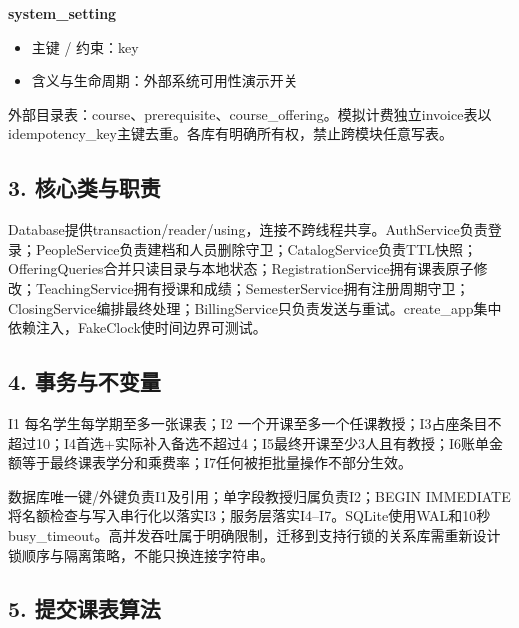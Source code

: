 \documentclass[UTF8,11pt,a4paper]{ctexart}
\providecommand{\tightlist}{\setlength{\itemsep}{0pt}\setlength{\parskip}{0pt}}
\begin{document}
\textbf{system\_\allowbreak{}setting}

\begin{itemize}
\tightlist
\item
  主键 / 约束：key
\item
  含义与生命周期：外部系统可用性演示开关
\end{itemize}

外部目录表：course、prerequisite、course\_\allowbreak{}offering。模拟计费独立invoice表以idempotency\_\allowbreak{}key主键去重。各库有明确所有权，禁止跨模块任意写表。

\hypertarget{3-ux6838ux5fc3ux7c7bux4e0eux804cux8d23}{%
\subsection{3.
核心类与职责}\label{3-ux6838ux5fc3ux7c7bux4e0eux804cux8d23}}

Database提供transaction/reader/using，连接不跨线程共享。AuthService负责登录；PeopleService负责建档和人员删除守卫；CatalogService负责TTL快照；OfferingQueries合并只读目录与本地状态；RegistrationService拥有课表原子修改；TeachingService拥有授课和成绩；SemesterService拥有注册周期守卫；ClosingService编排最终处理；BillingService只负责发送与重试。create\_\allowbreak{}app集中依赖注入，FakeClock使时间边界可测试。

\hypertarget{4-ux4e8bux52a1ux4e0eux4e0dux53d8ux91cf}{%
\subsection{4.
事务与不变量}\label{4-ux4e8bux52a1ux4e0eux4e0dux53d8ux91cf}}

I1 每名学生每学期至多一张课表；I2
一个开课至多一个任课教授；I3占座条目不超过10；I4首选+实际补入备选不超过4；I5最终开课至少3人且有教授；I6账单金额等于最终课表学分和乘费率；I7任何被拒批量操作不部分生效。

数据库唯一键/外键负责I1及引用；单字段教授归属负责I2；BEGIN
IMMEDIATE将名额检查与写入串行化以落实I3；服务层落实I4--I7。SQLite使用WAL和10秒busy\_\allowbreak{}timeout。高并发吞吐属于明确限制，迁移到支持行锁的关系库需重新设计锁顺序与隔离策略，不能只换连接字符串。

\hypertarget{5-ux63d0ux4ea4ux8bfeux8868ux7b97ux6cd5}{%
\subsection{5.
提交课表算法}\label{5-ux63d0ux4ea4ux8bfeux8868ux7b97ux6cd5}}
\end{document}
